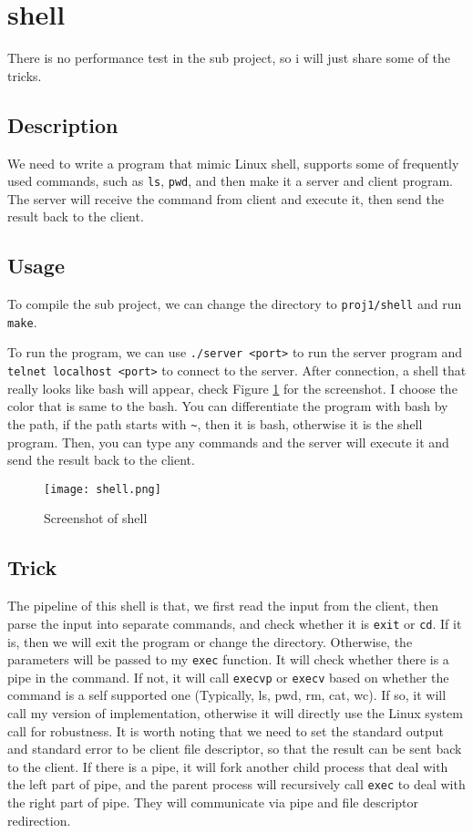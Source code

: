 \section{shell}
There is no performance test in the sub project, so i will just share some of the tricks.
\subsection{Description}
We need to write a program that mimic Linux shell, supports some of frequently used commands, such as \texttt{ls}, \texttt{pwd}, and then 
make it a server and client program. The server will receive the command from client and execute it, then send the result back to the client.

\subsection{Usage}
To compile the sub project, we can change the directory to \texttt{proj1/shell} and run \texttt{make}.

To run the program, we can use \texttt{./server <port>} to run the server program and \texttt{telnet localhost <port>} to connect to the server.
After connection, a shell that really looks like bash will appear, check Figure \ref{fig:shell} for the screenshot. I choose the color that is same to the bash. You can 
differentiate the program with bash by the path, if the path starts with \texttt{\~}, then it is bash, otherwise it is the shell program.
Then, you can type any commands and the server will execute it and send the result back to the client.

\begin{figure}[!h]
    \centering
    \texttt{[image: shell.png]}
    \caption{Screenshot of shell}
    \label{fig:shell}
\end{figure}

\subsection{Trick}
The pipeline of this shell is that, we first read the input from the client, then parse the input into separate commands, and check whether it is \texttt{exit} or \texttt{cd}.
If it is, then we will exit the program or change the directory. 
Otherwise, the parameters will be passed to my \texttt{exec} function.
It will check whether there is a pipe in the command. 
If not, it will call \texttt{execvp} or \texttt{execv} based on whether the command is a self supported one (Typically, ls, pwd, rm, cat, wc).
If so, it will call my version of implementation, otherwise it will directly use the Linux system call for robustness.
It is worth noting that we need to set the standard output and standard error to be client file descriptor, so that the result can be sent back to the client.
If there is a pipe, it will fork another child process that deal with the left part of pipe, and the parent process will recursively call \texttt{exec} to deal with the right part of pipe.
They will communicate via pipe and file descriptor redirection.


